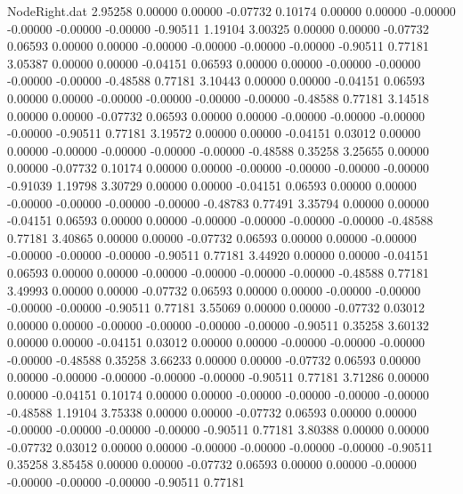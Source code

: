 \begin{filecontents}{NodeRight.dat}
   2.95258    0.00000    0.00000    -0.07732    0.10174    0.00000    0.00000   -0.00000   -0.00000   -0.00000   -0.00000   -0.90511    1.19104
   3.00325    0.00000    0.00000    -0.07732    0.06593    0.00000    0.00000   -0.00000   -0.00000   -0.00000   -0.00000   -0.90511    0.77181
   3.05387    0.00000    0.00000    -0.04151    0.06593    0.00000    0.00000   -0.00000   -0.00000   -0.00000   -0.00000   -0.48588    0.77181
   3.10443    0.00000    0.00000    -0.04151    0.06593    0.00000    0.00000   -0.00000   -0.00000   -0.00000   -0.00000   -0.48588    0.77181
   3.14518    0.00000    0.00000    -0.07732    0.06593    0.00000    0.00000   -0.00000   -0.00000   -0.00000   -0.00000   -0.90511    0.77181
   3.19572    0.00000    0.00000    -0.04151    0.03012    0.00000    0.00000   -0.00000   -0.00000   -0.00000   -0.00000   -0.48588    0.35258
   3.25655    0.00000    0.00000    -0.07732    0.10174    0.00000    0.00000   -0.00000   -0.00000   -0.00000   -0.00000   -0.91039    1.19798
   3.30729    0.00000    0.00000    -0.04151    0.06593    0.00000    0.00000   -0.00000   -0.00000   -0.00000   -0.00000   -0.48783    0.77491
   3.35794    0.00000    0.00000    -0.04151    0.06593    0.00000    0.00000   -0.00000   -0.00000   -0.00000   -0.00000   -0.48588    0.77181
   3.40865    0.00000    0.00000    -0.07732    0.06593    0.00000    0.00000   -0.00000   -0.00000   -0.00000   -0.00000   -0.90511    0.77181
   3.44920    0.00000    0.00000    -0.04151    0.06593    0.00000    0.00000   -0.00000   -0.00000   -0.00000   -0.00000   -0.48588    0.77181
   3.49993    0.00000    0.00000    -0.07732    0.06593    0.00000    0.00000   -0.00000   -0.00000   -0.00000   -0.00000   -0.90511    0.77181
   3.55069    0.00000    0.00000    -0.07732    0.03012    0.00000    0.00000   -0.00000   -0.00000   -0.00000   -0.00000   -0.90511    0.35258
   3.60132    0.00000    0.00000    -0.04151    0.03012    0.00000    0.00000   -0.00000   -0.00000   -0.00000   -0.00000   -0.48588    0.35258
   3.66233    0.00000    0.00000    -0.07732    0.06593    0.00000    0.00000   -0.00000   -0.00000   -0.00000   -0.00000   -0.90511    0.77181
   3.71286    0.00000    0.00000    -0.04151    0.10174    0.00000    0.00000   -0.00000   -0.00000   -0.00000   -0.00000   -0.48588    1.19104
   3.75338    0.00000    0.00000    -0.07732    0.06593    0.00000    0.00000   -0.00000   -0.00000   -0.00000   -0.00000   -0.90511    0.77181
   3.80388    0.00000    0.00000    -0.07732    0.03012    0.00000    0.00000   -0.00000   -0.00000   -0.00000   -0.00000   -0.90511    0.35258
   3.85458    0.00000    0.00000    -0.07732    0.06593    0.00000    0.00000   -0.00000   -0.00000   -0.00000   -0.00000   -0.90511    0.77181

\end{filecontents}

